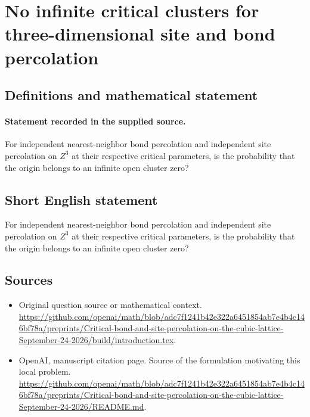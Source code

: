\documentclass[11pt]{article}
\begin{document}
\section*{No infinite critical clusters for three-dimensional site and bond percolation}\label{30007419}
\subsection{Definitions and mathematical statement}
\paragraph{Statement recorded in the supplied source.}
For independent nearest-neighbor bond percolation and independent site percolation on $Z^3$ at their respective critical parameters, is the probability that the origin belongs to an infinite open cluster zero?
\subsection{Short English statement}
For independent nearest-neighbor bond percolation and independent site percolation on $Z^3$ at their respective critical parameters, is the probability that the origin belongs to an infinite open cluster zero?
\subsection{Sources}
\begin{itemize}
\item[S1] Original question source or mathematical context.
\url{https://github.com/openai/math/blob/adc7f1241b42e322a6451854ab7e4b4c146bf78a/preprints/Critical-bond-and-site-percolation-on-the-cubic-lattice-September-24-2026/build/introduction.tex}.
\item[S2] OpenAI, manuscript citation page. Source of the formulation motivating this local problem.
\url{https://github.com/openai/math/blob/adc7f1241b42e322a6451854ab7e4b4c146bf78a/preprints/Critical-bond-and-site-percolation-on-the-cubic-lattice-September-24-2026/README.md}.
\end{itemize}
\end{document}
